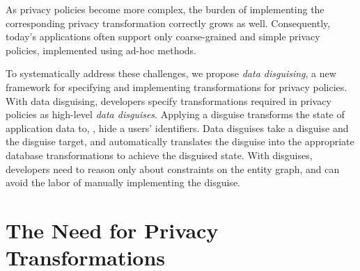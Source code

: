As privacy policies become more complex, the burden of implementing the corresponding privacy
transformation correctly grows as well.  Consequently, today's applications often support only
coarse-grained and simple privacy policies, implemented using ad-hoc methods.


To systematically address these challenges, we propose \emph{data disguising}, a new framework for
specifying and implementing transformations for privacy policies.
%
With data disguising, developers specify transformations required in privacy policies as high-level \emph{data
disguises}. Applying a disguise transforms the state of application data to, \eg, hide a users'
identifiers.
%
%
Data disguises take a disguise and the disguise target, and automatically translates the
disguise into the appropriate database transformations to achieve the disguised state. With
disguises, developers need to reason only about constraints on the entity graph, and can avoid the
labor of manually implementing the disguise.

\section{The Need for Privacy Transformations}
\label{sec:survey}

